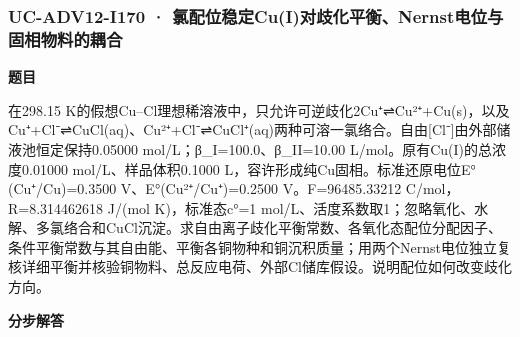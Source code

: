 \documentclass[UTF8,11pt,a4paper]{ctexart}
\begin{document}
\subsubsection*{UC-ADV12-I170 · 氯配位稳定Cu(I)对歧化平衡、Nernst电位与固相物料的耦合}
\noindent\textbf{题目}\par
在298.15 K的假想Cu–Cl理想稀溶液中，只允许可逆歧化2Cu⁺⇌Cu²⁺+Cu(s)，以及Cu⁺+Cl⁻⇌CuCl(aq)、Cu²⁺+Cl⁻⇌CuCl⁺(aq)两种可溶一氯络合。自由[Cl⁻]由外部储液池恒定保持0.05000 mol/L；β\_I=100.0、β\_II=10.00 L/mol。原有Cu(I)的总浓度0.01000 mol/L、样品体积0.1000 L，容许形成纯Cu固相。标准还原电位E°(Cu⁺/Cu)=0.3500 V、E°(Cu²⁺/Cu⁺)=0.2500 V。F=96485.33212 C/mol，R=8.314462618 J/(mol K)，标准态c°=1 mol/L、活度系数取1；忽略氧化、水解、多氯络合和CuCl沉淀。求自由离子歧化平衡常数、各氧化态配位分配因子、条件平衡常数与其自由能、平衡各铜物种和铜沉积质量；用两个Nernst电位独立复核详细平衡并核验铜物料、总反应电荷、外部Cl储库假设。说明配位如何改变歧化方向。\par
\medskip\noindent\textbf{分步解答}
\end{document}
